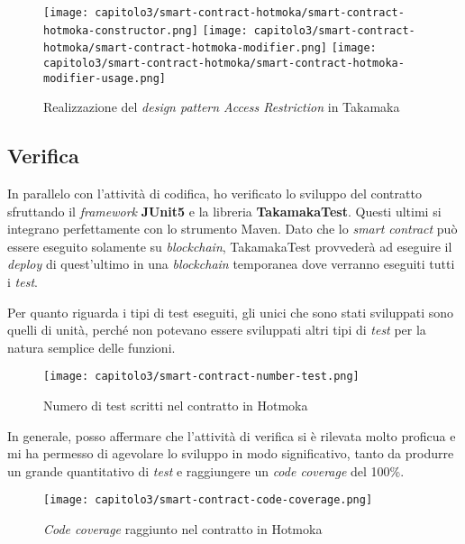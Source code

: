 \begin{figure}[h!]
  \centering
  \texttt{[image: capitolo3/smart-contract-hotmoka/smart-contract-hotmoka-constructor.png]}
  \texttt{[image: capitolo3/smart-contract-hotmoka/smart-contract-hotmoka-modifier.png]}
  \texttt{[image: capitolo3/smart-contract-hotmoka/smart-contract-hotmoka-modifier-usage.png]}
  \caption{Realizzazione del \textit{design pattern Access Restriction} in Takamaka}
\end{figure}

\subsection{Verifica}
In parallelo con l'attività di codifica, ho verificato lo sviluppo del contratto sfruttando il \textit{framework} \textbf{JUnit5} e la libreria \textbf{TakamakaTest}. Questi ultimi si integrano perfettamente con lo strumento Maven. Dato che lo \textit{smart contract} può essere eseguito solamente su \textit{blockchain}, TakamakaTest provvederà ad eseguire il \textit{deploy} di quest'ultimo in una \textit{blockchain} temporanea dove verranno eseguiti tutti i \textit{test}. 

Per quanto riguarda i tipi di test eseguiti, gli unici che sono stati sviluppati sono quelli di unità, perché non potevano essere sviluppati altri tipi di \textit{test} per la natura semplice delle funzioni.

\begin{figure}[h!]
  \centering
  \texttt{[image: capitolo3/smart-contract-number-test.png]}
  \caption{Numero di test scritti nel contratto in Hotmoka}
\end{figure}

In generale, posso affermare che l'attività di verifica si è rilevata molto proficua e mi ha permesso di agevolare lo sviluppo in modo significativo, tanto da produrre un grande quantitativo di \textit{test} e raggiungere un \textit{code coverage} del 100\%.

\begin{figure}[h!]
  \centering
  \texttt{[image: capitolo3/smart-contract-code-coverage.png]}
  \caption{\textit{Code coverage} raggiunto nel contratto in Hotmoka}
\end{figure}
